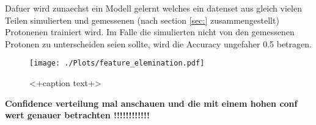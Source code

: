 Dafuer wird zunaechst ein Modell gelernt welches ein datenset aus gleich vielen Teilen simulierten und gemessenen (nach section \ref{sec:} zusammengestellt) Protonenen trainiert wird. 
Im Falle die simulierten nicht von den gemessenen Protonen zu unterscheiden seien sollte, wird die Accuracy ungefaher 0.5 betragen. 
\begin{figure}[H]
  \centering
  \texttt{[image: ./Plots/feature\_elemination.pdf]}
  \caption{<+caption text+>}
  \label{fig:<+label+>}
\end{figure}

\textbf{Confidence verteilung mal anschauen und die mit einem hohen conf wert genauer betrachten !!!!!!!!!!!!}
